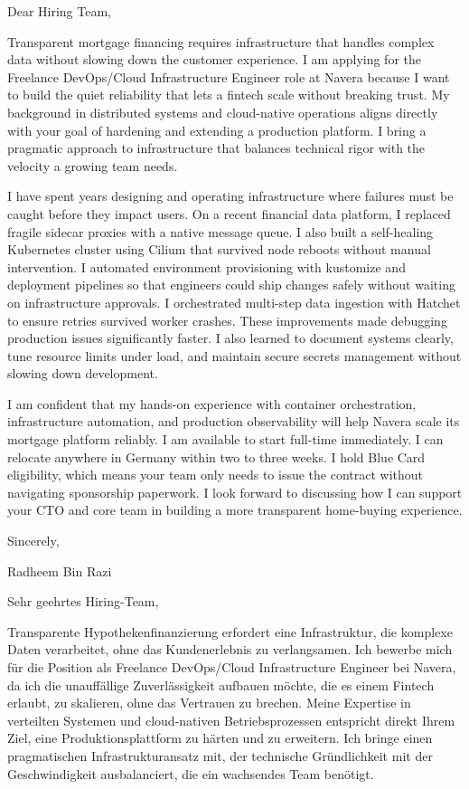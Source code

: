 \documentclass[11pt,a4paper]{coverletter}
\begin{document}

\opening{Dear Hiring Team,}

Transparent mortgage financing requires infrastructure that handles complex data without slowing down the customer experience. I am applying for the Freelance DevOps/Cloud Infrastructure Engineer role at Navera because I want to build the quiet reliability that lets a fintech scale without breaking trust. My background in distributed systems and cloud-native operations aligns directly with your goal of hardening and extending a production platform. I bring a pragmatic approach to infrastructure that balances technical rigor with the velocity a growing team needs.

I have spent years designing and operating infrastructure where failures must be caught before they impact users. On a recent financial data platform, I replaced fragile sidecar proxies with a native message queue. I also built a self-healing Kubernetes cluster using Cilium that survived node reboots without manual intervention. I automated environment provisioning with kustomize and deployment pipelines so that engineers could ship changes safely without waiting on infrastructure approvals. I orchestrated multi-step data ingestion with Hatchet to ensure retries survived worker crashes. These improvements made debugging production issues significantly faster. I also learned to document systems clearly, tune resource limits under load, and maintain secure secrets management without slowing down development.

I am confident that my hands-on experience with container orchestration, infrastructure automation, and production observability will help Navera scale its mortgage platform reliably. I am available to start full-time immediately. I can relocate anywhere in Germany within two to three weeks. I hold Blue Card eligibility, which means your team only needs to issue the contract without navigating sponsorship paperwork. I look forward to discussing how I can support your CTO and core team in building a more transparent home-buying experience.

\closing{Sincerely,}{Radheem Bin Razi}

\clearpage
{}


\opening{Sehr geehrtes Hiring-Team,}

Transparente Hypothekenfinanzierung erfordert eine Infrastruktur, die komplexe Daten verarbeitet, ohne das Kundenerlebnis zu verlangsamen. Ich bewerbe mich für die Position als Freelance DevOps/Cloud Infrastructure Engineer bei Navera, da ich die unauffällige Zuverlässigkeit aufbauen möchte, die es einem Fintech erlaubt, zu skalieren, ohne das Vertrauen zu brechen. Meine Expertise in verteilten Systemen und cloud-nativen Betriebsprozessen entspricht direkt Ihrem Ziel, eine Produktionsplattform zu härten und zu erweitern. Ich bringe einen pragmatischen Infrastrukturansatz mit, der technische Gründlichkeit mit der Geschwindigkeit ausbalanciert, die ein wachsendes Team benötigt.
\end{document}

